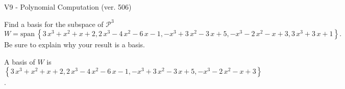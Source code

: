 \begin{exercise}
  \begin{exerciseTitle}V9 - Polynomial Computation (ver. 506)\end{exerciseTitle}
  \begin{exerciseStatement}
    Find a basis for the subspace of \(\mathcal{P}^3\) 
\[W=\mathrm{span}\ \left\{3 \, x^{3} + x^{2} + x + 2 , 2 \, x^{3} - 4 \, x^{2} - 6 \, x - 1 , -x^{3} + 3 \, x^{2} - 3 \, x + 5 , -x^{3} - 2 \, x^{2} - x + 3 , 3 \, x^{3} + 3 \, x + 1\right\}.\]
 Be sure to explain why your result is a basis.


  \end{exerciseStatement}
  \begin{exerciseAnswer}
   A basis of \(W\) is  \(\left\{3 \, x^{3} + x^{2} + x + 2 , 2 \, x^{3} - 4 \, x^{2} - 6 \, x - 1 , -x^{3} + 3 \, x^{2} - 3 \, x + 5 , -x^{3} - 2 \, x^{2} - x + 3\right\}\).
  


  \end{exerciseAnswer}
\end{exercise}